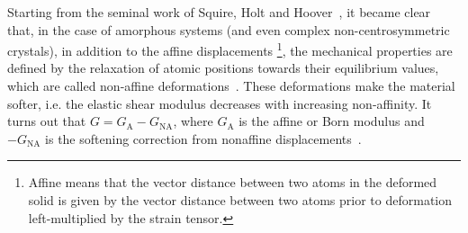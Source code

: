 \documentclass[pre,twocolumn,aps,superscriptaddress,showpacs]{revtex4-1}
\begin{document}
Starting from the seminal work of Squire, Holt and Hoover~\cite{Squire}, it became clear that, in the case of amorphous systems (and even complex non-centrosymmetric crystals), in addition to the affine displacements \footnote{Affine means that the vector distance between two atoms in the deformed solid is given by the vector distance between two atoms prior to deformation left-multiplied by the strain tensor.}, the mechanical properties are defined by the relaxation of atomic positions towards their equilibrium values, which are called non-affine deformations~\cite{Lemaitre2006}. These deformations make the material softer, i.e. the elastic shear modulus decreases with increasing non-affinity. It turns out that $G = G_\text{A}-G_\text{NA}$, where $G_\text{A}$ is the affine or Born modulus and $-G_\text{NA}$ is the softening correction from nonaffine displacements~\cite{ZacconeScossa2011}. 


\end{document}
